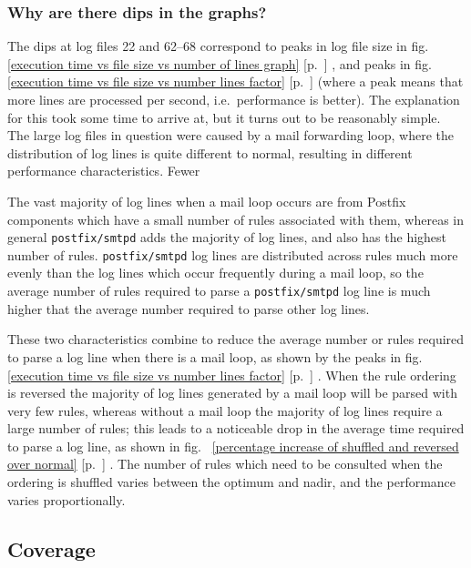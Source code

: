 \documentclass[draft]{svmult}
\newcommand{\refwithpage}[1]{%
    \empty{}\ref{#1} [p.~\pageref{#1}]%
}
\newcommand{\daemon}[1]{%
    \texttt{postfix/#1}%
}
\begin{document}
\subsubsection{Why are there dips in the graphs?}
\label{Why are there dips in the graphs?}

The dips at log files 22 and 62--68 correspond to peaks in log file size in
fig.~\refwithpage{execution time vs file size vs number of lines graph},
and peaks in fig.~\refwithpage{execution time vs file size vs number lines
factor} (where a peak means that more lines are processed per second, i.e.\
performance is better).  The explanation for this took some time to arrive
at, but it turns out to be reasonably simple.  The large log files in
question were caused by a mail forwarding loop, where the distribution of
log lines is quite different to normal, resulting in different performance
characteristics.  Fewer 

The vast majority of log lines when a mail loop occurs are from Postfix
components which have a small number of rules associated with them, whereas
in general \daemon{smtpd} adds the majority of log lines, and also has the
highest number of rules.  \daemon{smtpd} log lines are distributed across
rules much more evenly than the log lines which occur frequently during a
mail loop, so the average number of rules
required to parse a \daemon{smtpd} log line is much higher that the average
number required to parse other log lines.

These two characteristics combine to reduce the average number or rules
required to parse a log line when there is a mail loop, as shown by the
peaks in fig.~\refwithpage{execution time vs file size vs number lines
factor}.  When the rule ordering is reversed the majority of log lines
generated by a mail loop will be parsed with very few rules, whereas
without a mail loop the majority of log lines require a large number of
rules; this leads to a noticeable drop in the average time required to
parse a log line, as shown in fig.~\refwithpage{percentage increase of
shuffled and reversed over normal}.  The number of rules which need to be
consulted when the ordering is shuffled varies between the optimum and
nadir, and the performance varies proportionally.



\subsection{Coverage}

\label{coverage}
\end{document}
